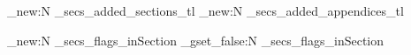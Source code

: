%   
% 


\usepackage{expl3 }
\usepackage{xparse}     
\usepackage{xargs }

\usepackage{etoolbox} 
\usepackage{graphicx} 
\usepackage{xifthen }

\ExplSyntaxOn



\seq_new:N \g_secs_added_sections_tl    %
\seq_new:N \g_secs_added_appendices_tl  %

\bool_new:N        \g_secs_flags_inSection
\bool_gset_false:N \g_secs_flags_inSection






\ExplSyntaxOff
